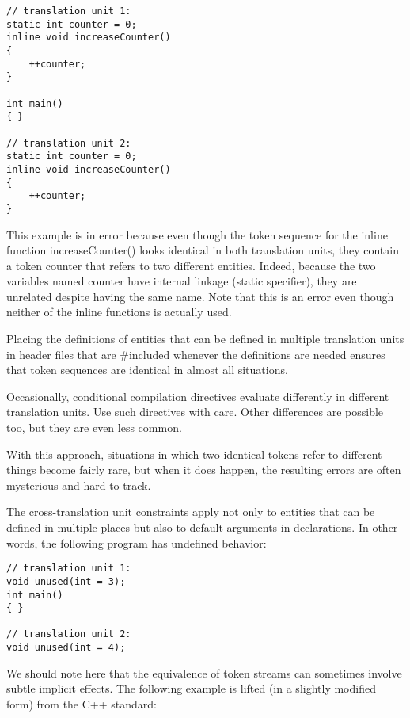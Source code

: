 \begin{lstlisting}[style=styleCXX]
// translation unit 1:
static int counter = 0;
inline void increaseCounter()
{
	++counter;
}

int main()
{ }

// translation unit 2:
static int counter = 0;
inline void increaseCounter()
{
	++counter;
}
\end{lstlisting}

This example is in error because even though the token sequence for the inline function increaseCounter() looks identical in both translation units, they contain a token counter that refers to two different entities. Indeed, because the two variables named counter have internal linkage (static specifier), they are unrelated despite having the same name. Note that this is an error even though neither of the inline functions is actually used.

Placing the definitions of entities that can be defined in multiple translation units in header files that are \#included whenever the definitions are needed ensures that token sequences are identical in almost all situations.

\begin{tcolorbox}[colback=webgreen!5!white,colframe=webgreen!75!black]
\hspace*{0.75cm}Occasionally, conditional compilation directives evaluate differently in different translation units. Use such directives with care. Other differences are possible too, but they are even less common.
\end{tcolorbox}

With this approach, situations in which two identical tokens refer to different things become fairly rare, but when it does happen, the resulting errors are often mysterious and hard to track.

The cross-translation unit constraints apply not only to entities that can be defined in multiple places but also to default arguments in declarations. In other words, the following program has undefined behavior:

\begin{lstlisting}[style=styleCXX]
// translation unit 1:
void unused(int = 3);
int main()
{ }

// translation unit 2:
void unused(int = 4);
\end{lstlisting}

We should note here that the equivalence of token streams can sometimes involve subtle implicit effects. The following example is lifted (in a slightly modified form) from the C++ standard:

